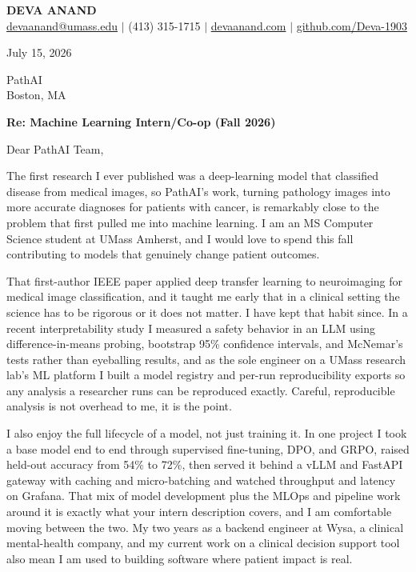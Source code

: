 \documentclass[letterpaper,11pt]{article}
\begin{document}
\begin{center}
    {\fontsize{18}{20}\selectfont\bfseries DEVA ANAND}\\ \vspace{3pt}
    {\small
    \href{mailto:devaanand@umass.edu}{devaanand@umass.edu}
    \enspace$\vert$\enspace
    (413) 315-1715
    \enspace$\vert$\enspace
    \href{https://devaanand.com}{devaanand.com}
    \enspace$\vert$\enspace
    \href{https://github.com/Deva-1903}{github.com/Deva-1903}}
\end{center}
\vspace{6pt}

\noindent July 15, 2026

\vspace{2pt}

\noindent PathAI\\
Boston, MA

\vspace{2pt}

\noindent \textbf{Re: Machine Learning Intern/Co-op (Fall 2026)}

\vspace{4pt}

\noindent Dear PathAI Team,

The first research I ever published was a deep-learning model that classified disease from medical images, so PathAI's work, turning pathology images into more accurate diagnoses for patients with cancer, is remarkably close to the problem that first pulled me into machine learning. I am an MS Computer Science student at UMass Amherst, and I would love to spend this fall contributing to models that genuinely change patient outcomes.

That first-author IEEE paper applied deep transfer learning to neuroimaging for medical image classification, and it taught me early that in a clinical setting the science has to be rigorous or it does not matter. I have kept that habit since. In a recent interpretability study I measured a safety behavior in an LLM using difference-in-means probing, bootstrap 95\% confidence intervals, and McNemar's tests rather than eyeballing results, and as the sole engineer on a UMass research lab's ML platform I built a model registry and per-run reproducibility exports so any analysis a researcher runs can be reproduced exactly. Careful, reproducible analysis is not overhead to me, it is the point.

I also enjoy the full lifecycle of a model, not just training it. In one project I took a base model end to end through supervised fine-tuning, DPO, and GRPO, raised held-out accuracy from 54\% to 72\%, then served it behind a vLLM and FastAPI gateway with caching and micro-batching and watched throughput and latency on Grafana. That mix of model development plus the MLOps and pipeline work around it is exactly what your intern description covers, and I am comfortable moving between the two. My two years as a backend engineer at Wysa, a clinical mental-health company, and my current work on a clinical decision support tool also mean I am used to building software where patient impact is real.
\end{document}
